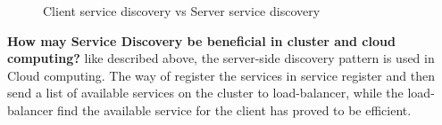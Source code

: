 \begin{figure}[bth]
	\centering
	\qquad
	\caption{Client service discovery vs Server service discovery }
	\label{fig:ClienServerService}
\end{figure}



\textbf{How may Service Discovery be beneficial in cluster and cloud computing?}  
like described above, the server-side discovery pattern is used in Cloud computing. The way of register the services in service register and then send a list of available services on the cluster to load-balancer, while the load-balancer find the available service for the client has proved to be efficient.   
